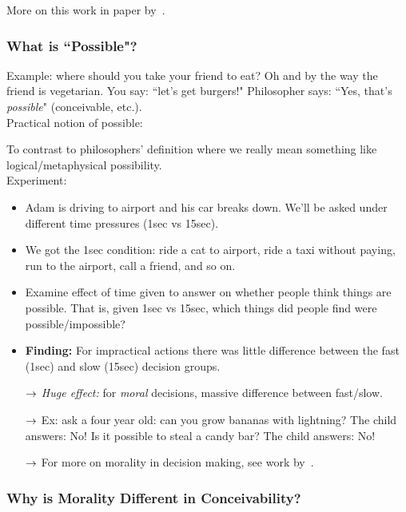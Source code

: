 More on this work in paper by~\citet{morris2018causal}.


\subsubsection{What is ``Possible"?}

Example: where should you take your friend to eat? Oh and by the way the friend is vegetarian. You say: ``let's get burgers!" Philosopher says: ``Yes, that's {\it possible}" (conceivable, etc.). \\

Practical notion of possible:

To contrast to philosophers' definition where we really mean something like logical/metaphysical possibility. \\

Experiment: 
\begin{itemize}
    \item Adam is driving to airport and his car breaks down. We'll be asked under different time pressures (1sec vs 15sec).
    
    \item We got the 1sec condition: ride a cat to airport, ride a taxi without paying, run to the airport, call a friend, and so on.
    
    \item Examine effect of time given to answer on whether people think things are possible. That is, given 1sec vs 15sec, which things did people find were possible/impossible?
    
    \item {\bf Finding:} For impractical actions there was little difference between the fast (1sec) and slow (15sec) decision groups.
    
    $\rightarrow$ {\it Huge effect:} for {\it moral} decisions, massive difference between fast/slow.
    
    $\rightarrow$ Ex: ask a four year old: can you grow bananas with lightning? The child answers: No! Is it possible to steal a candy bar? The child answers: No!

    $\rightarrow$ For more on morality in decision making, see work by~\citet{baron1997protected,crockett2017moral}.
\end{itemize}

\subsubsection{Why is Morality Different in Conceivability?}

